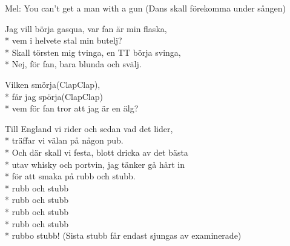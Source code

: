 \begin{SongText}
    \begin{SongInfo}
        Mel: You can’t get a man with a gun
        (Dans skall förekomma under sången)
    \end{SongInfo}
    \begin{SongVerse}
        Jag vill börja gasqua, var fan är min flaska,\\*%
        vem i helvete stal min butelj?\\*%
        Skall törsten mig tvinga, en TT börja svinga,\\*%
        Nej, för fan, bara blunda och svälj.
    \end{SongVerse}
    \begin{SongVerse}
        Vilken smörja(ClapClap),\\*%
        får jag spörja(ClapClap)\\*%
        vem för fan tror att jag är en älg?
    \end{SongVerse}
    \begin{SongVerse}
        Till England vi rider och sedan vad det lider,\\*%
        träffar vi välan på någon pub.\\*%
        Och där skall vi festa, blott dricka av det bästa\\*%
        utav whisky och portvin, jag tänker gå hårt in\\*%
        för att smaka på rubb och stubb.\\*%
        rubb och stubb\\*%
        rubb och stubb\\*%
        rubb och stubb\\*%
        rubb och stubb\\*%
        rubbo stubb! (Sista stubb får endast sjungas av
        examinerade)
    \end{SongVerse}
\end{SongText}
